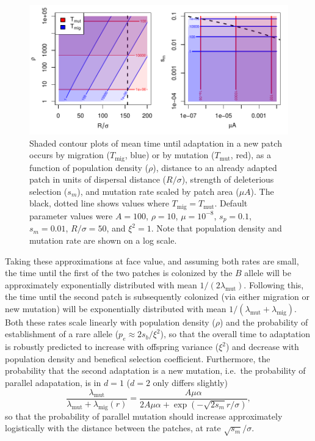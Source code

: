 \documentclass{article}
\newcommand{\migrate}{\lambda_\text{mig}}
\newcommand{\mutrate}{\lambda_\text{mut}}
\newcommand{\Tmig}{T_\text{mig}}
\newcommand{\Tmut}{T_\text{mut}}
\begin{document}
\begin{figure}[ht]
  \begin{center}
    \includegraphics{phase-diagram-log}
  \end{center}
  \caption{
  Shaded contour plots of
  mean time until adaptation in a new patch occurs by migration ($\Tmig$, blue) or by mutation ($\Tmut$, red),
  as a function of population density ($\rho$), 
  distance to an already adapted patch in units of dispersal distance ($R/\sigma$),
  strength of deleterious selection ($s_m$),
  and mutation rate scaled by patch area ($\mu A$).
  The black, dotted line shows values where $\Tmig=\Tmut$.
  Default parameter values were $A=100$, $\rho=10$, $\mu=10^{-8}$, $s_p=0.1$, $s_m=0.01$, $R/\sigma=50$, and $\xi^2=1$.
  Note that population density and mutation rate are shown on a log scale.
  \label{fig:phase_diagram}
  }
\end{figure}

Taking these approximations at face value, 
and assuming both rates are small, 
the time until the first of the two patches is colonized by the $B$
allele will be approximately exponentially distributed with mean $1/(2
\mutrate)$.
Following this, the time until the second patch is subsequently colonized 
(via either migration or new mutation) 
will be exponentially distributed with mean $1/(\mutrate+\migrate)$.
Both these rates scale linearly with population density ($\rho$) 
and the probability of establishment of a rare allele ($p_e\approx 2 s_b/\xi^2$),
so that the overall time to adaptation is robustly predicted to increase with offspring variance ($\xi^2$)
and decrease with population density and benefical selection coefficient.
Furthermore, the probability that the second adaptation is a new mutation,
i.e.\ the probability of parallel adapatation, is in $d=1$ ($d=2$ only differs slightly)
\begin{equation} \label{eqn:parallel_prob}
  \frac{\mutrate}{\mutrate+\migrate(r)} = \frac{ A \mu \alpha }{2 A
    \mu \alpha + \exp\left(- \sqrt{2 s_m} r / \sigma \right) },  
\end{equation}
so that the probability of parallel mutation should increase
approximately logistically with the distance between the patches, at rate $\sqrt{s_m} /\sigma$. 
\end{document}
